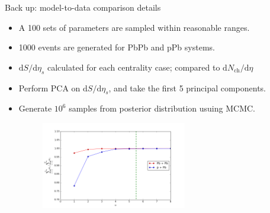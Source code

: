 \documentclass[11pt]{beamer}
\begin{document}
\begin{frame}[noframenumbering]{Back up: model-to-data comparison details}
\begin{itemize}
\item A 100 sets of parameters are sampled within reasonable ranges.
\item 1000 events are generated for PbPb and pPb systems.
\item $\mathrm{d}S/\mathrm{d}\eta_s$ calculated for each centrality case; compared to $\mathrm{d}N_{\textrm{ch}}/\mathrm{d}\eta$
\item Perform PCA on $\mathrm{d}S/\mathrm{d}\eta_s$, and take the first 5 principal components.
\item Generate $10^6$ samples from posterior distribution usuing MCMC.
\begin{figure}
\begin{center}
\includegraphics[width = 0.6\textwidth]{./pics/weight.png}
\end{center}
\end{figure}
\end{itemize}
\end{frame}
\end{document}
